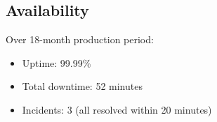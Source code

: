 \subsection{Availability}

Over 18-month production period:
\begin{itemize}
    \item Uptime: 99.99\%
    \item Total downtime: 52 minutes
    \item Incidents: 3 (all resolved within 20 minutes)
\end{itemize}

